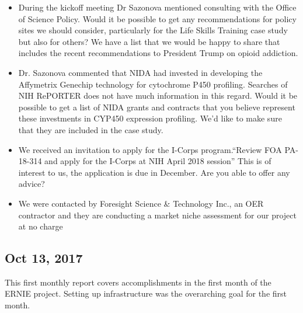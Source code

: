 \documentclass[11pt, oneside]{article}   	%
\begin{document}
\begin{itemize}
 \item During the kickoff meeting Dr Sazonova mentioned consulting with the Office of Science Policy. Would it be possible to get any recommendations for policy sites we should consider, particularly for the Life Skills Training case study but also for others? We have a list that we would be happy to share that includes the recent recommendations to President Trump on opioid addiction.
 \item Dr. Sazonova commented that NIDA had invested in developing the Affymetrix Genechip technology for cytochrome P450 profiling. Searches of NIH RePORTER does not have much information in this regard. Would it be possible to get a list of NIDA grants and contracts that you believe represent these investments in CYP450 expression profiling. We'd like to make sure that they are included in the case study.
 \item We received an invitation to apply for the I-Corps program.``Review FOA PA-18-314 and apply for the I-Corps at NIH April 2018 session'' This is of interest to us, the application is due in December. Are you able to offer any advice?
 \item We were contacted by Foresight Science \& Technology Inc., an OER contractor and they are conducting a market niche assessment for our project at no charge
 \end {itemize}


\pagebreak
\subsection*{Oct 13, 2017}

This first monthly report covers accomplishments in the first month of the ERNIE project. Setting up infrastructure was the overarching goal for the first month.
\end{document}
